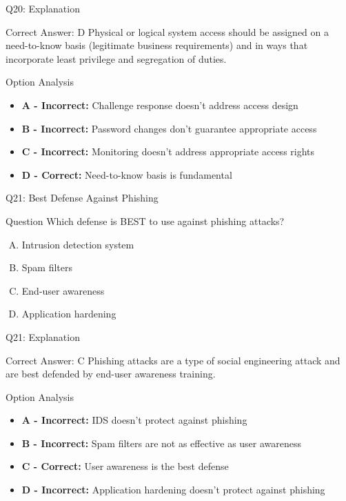 \documentclass{beamer}
\begin{document}
	\begin{frame}{Q20: Explanation}
		\begin{block}{Correct Answer: D}
			Physical or logical system access should be assigned on a need-to-know basis (legitimate business requirements) and in ways that incorporate least privilege and segregation of duties.
		\end{block}
		\begin{block}{Option Analysis}
			\begin{itemize}
				\item \textbf{A - Incorrect:} Challenge response doesn't address access design
				\item \textbf{B - Incorrect:} Password changes don't guarantee appropriate access
				\item \textbf{C - Incorrect:} Monitoring doesn't address appropriate access rights
				\item \textbf{D - Correct:} Need-to-know basis is fundamental
			\end{itemize}
		\end{block}
	\end{frame}
	
	\begin{frame}{Q21: Best Defense Against Phishing}
		\begin{block}{Question}
			Which defense is BEST to use against phishing attacks?
		\end{block}
		\begin{enumerate}[(A)]
			\item Intrusion detection system
			\item Spam filters
			\item End-user awareness
			\item Application hardening
		\end{enumerate}
	\end{frame}
	
	\begin{frame}{Q21: Explanation}
		\begin{block}{Correct Answer: C}
			Phishing attacks are a type of social engineering attack and are best defended by end-user awareness training.
		\end{block}
		\begin{block}{Option Analysis}
			\begin{itemize}
				\item \textbf{A - Incorrect:} IDS doesn't protect against phishing
				\item \textbf{B - Incorrect:} Spam filters are not as effective as user awareness
				\item \textbf{C - Correct:} User awareness is the best defense
				\item \textbf{D - Incorrect:} Application hardening doesn't protect against phishing
			\end{itemize}
		\end{block}
	\end{frame}
	
\end{document}
